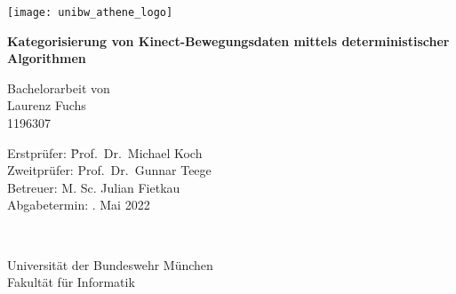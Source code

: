 \begin{center}

\vspace*{1cm}

\texttt{[image: unibw\_athene\_logo]}

\vspace{1.5cm}
{\Huge
\textbf{Kategorisierung von Kinect-Bewegungsdaten mittels deterministischer Algorithmen}\\
}
\vspace{1.5cm}


{\Large
Bachelorarbeit von\\
Laurenz Fuchs\\
1196307\\
}
\vspace{2cm}

\parbox{1cm}{
\begin{large}
\begin{tabbing}
Erstprüfer: \hspace{.5cm} \=Prof.\ Dr.\ Michael Koch\\[2mm]
Zweitprüfer: \>Prof.\ Dr.\ Gunnar Teege\\[2mm]
Betreuer:
\>M. Sc. Julian Fietkau\\[5mm]
Abgabetermin: . Mai 2022\\
\end{tabbing}
\end{large}}\\
\vspace{5mm}

\vfill

{\Large
Universität der Bundeswehr München\\
Fakultät für Informatik\\
}

\end{center}
